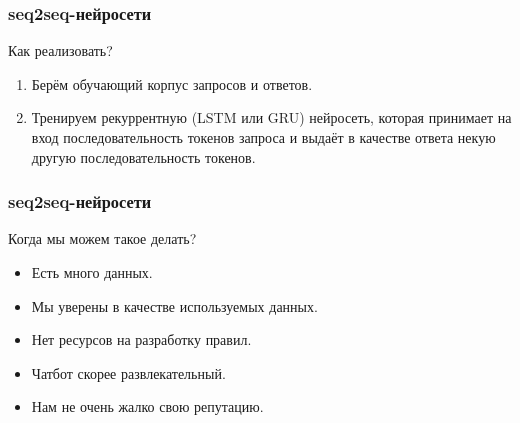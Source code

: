 \documentclass[t, 11pt]{beamer}
\begin{document}
	
	
	
\begin{frame}
	\frametitle{\insertsection}
	\frametitle{seq2seq-нейросети}
	Как реализовать?
	
	\begin{enumerate}
\item Берём обучающий корпус запросов и ответов.
\item Тренируем рекуррентную (LSTM или GRU) нейросеть, которая
принимает на вход последовательность токенов запроса и
выдаёт в качестве ответа некую другую последовательность
токенов.
\end{enumerate}
\end{frame}



\begin{frame}
	\frametitle{\insertsection}
	\frametitle{seq2seq-нейросети}
	Когда мы можем такое делать?
\begin{itemize}
\item Есть много данных.
\item Мы уверены в качестве используемых данных.
\item Нет ресурсов на разработку правил.
\item Чатбот скорее развлекательный.
\item Нам не очень жалко свою репутацию.
\end{itemize}
\end{frame}

%
%	
%	
%	
%	
%	
%	
%



%
%  
\end{document}
